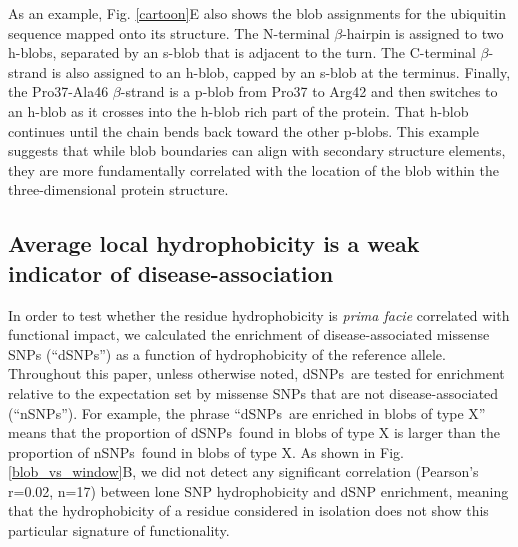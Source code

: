 \documentclass[9pt,twocolumn,twoside,lineno]{pnas-new}
\newcommand{\aucomment}[1]{}
\newcommand{\inserted}[1]{{#1}}
\newcommand{\dSNPs}{dSNPs~}
\newcommand{\nSNPs}{nSNPs~}
\begin{document}
\inserted{As an example, Fig. \ref{cartoon}E also shows the blob assignments for the ubiquitin sequence mapped onto its structure. The N-terminal $\beta$-hairpin is assigned to two h-blobs, separated by an s-blob that is adjacent to the turn. The C-terminal $\beta$-strand is also assigned to an h-blob, capped by an s-blob at the terminus. Finally, the Pro37-Ala46 $\beta$-strand is a p-blob from Pro37 to Arg42 and then switches to an h-blob as it crosses into the h-blob rich part of the protein. That h-blob continues until the chain bends back toward the other p-blobs. This example suggests that while blob boundaries can align with secondary structure elements, they are more fundamentally correlated with the location of the blob within the three-dimensional protein structure. }

\subsection*{Average local hydrophobicity is a weak indicator of disease-association}
\aucomment{In the previous version, this subsection and the next were joined. They were split and content was reordered to accommodate the new information on transmembrane domains}
In order to test whether the residue hydrophobicity is {\em prima facie} correlated with functional impact, we calculated the enrichment of disease-associated missense SNPs (``dSNPs'') as a function of hydrophobicity of the reference allele. Throughout this paper, unless otherwise noted, \dSNPs are tested for enrichment relative to the expectation set by missense SNPs that are not disease-associated (``nSNPs''). For example, the phrase ``\dSNPs are enriched in blobs of type X'' means that the proportion of \dSNPs found in blobs of type X is larger than the proportion of \nSNPs found in blobs of type X. As shown in Fig. \ref{blob_vs_window}B, we did not detect any significant correlation (Pearson's r=0.02, n=17) between lone SNP hydrophobicity and dSNP enrichment, meaning that the hydrophobicity of a residue considered in isolation does not show this particular signature of functionality.
\end{document}
